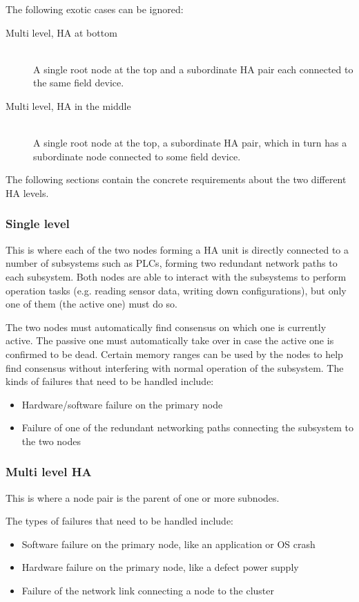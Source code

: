 The following exotic cases can be ignored:

\begin{description}
	\item [ Multi level, \gls{HA} at bottom ] \hfill\\
	A single root node at the top and a subordinate HA pair each connected
	to the same field device.

	\item [ Multi level, \gls{HA} in the middle ] \hfill\\
	A single root node at the top, a subordinate HA pair, which in turn has
	a subordinate node connected to some field device.
\end{description}

The following sections contain the concrete requirements about the two
different \gls{HA} levels.

\subsubsection{Single level}
This is where each of the two nodes forming a HA unit is directly connected to a number of
subsystems such as \glspl{PLC}, forming two redundant network paths to each
subsystem. Both nodes are able to interact with the subsystems to perform
operation tasks (e.g. reading sensor data, writing down configurations), but
only one of them (the active one) must do so.

The two nodes must automatically find consensus on which one is currently active. The
passive one must automatically take over in case the active one is confirmed to
be dead. Certain memory ranges can be used by the nodes to help find consensus
without interfering with normal operation of the subsystem. The kinds of
failures that need to be handled include:
\begin{itemize}
	\item Hardware/software failure on the primary node
	\item Failure of one of the redundant networking paths connecting the subsystem to the two nodes
\end{itemize}


\subsubsection{Multi level HA}
This is where a node pair is the parent of one or more subnodes.

The types of failures that need to be handled include:
\begin{itemize}
	\item Software failure on the primary node, like an application or OS crash
	\item Hardware failure on the primary node, like a defect power supply
	\item Failure of the network link connecting a node to the cluster
\end{itemize}


